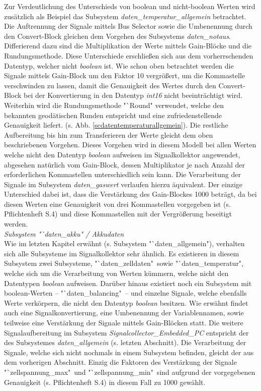 \documentclass[fontsize = 12pt, paper = a4]{scrreprt}
\begin{document}
Zur Verdeutlichung des Unterschieds von boolean und nicht-boolean Werten wird zusätzlich als Beispiel das Subsystem \textit{daten\_temperatur\_allgemein} betrachtet. Die Auftrennung der Signale mittels Bus Selector sowie die Umbenennung durch den Convert-Block gleichen dem Vorgehen des Subsystems \textit{daten\_notaus}. Differierend dazu sind die Multiplikation der Werte mittels Gain-Blöcke und die Rundungsmethode. Diese Unterschiede erschließen sich aus dem vorherrschenden Datentyp, welcher nicht \textit{boolean} ist. Wie schon oben betrachtet werden die Signale mittels Gain-Block um den Faktor 10 vergrößert, um die Kommastelle verschwinden zu lassen, damit die Genauigkeit des Wertes durch den Convert-Block bei der Konvertierung in den Datentyp \textit{int16} nicht beeinträchtigt wird. Weiterhin wird die Rundungsmethode "`Round" verwendet, welche den bekannten geodätischen Runden entspricht und eine zufriedenstellende Genauigkeit liefert. (s. Abb. \ref{scdatentemperaturallgemein}). Die restliche Aufbereitung bis hin zum Transferieren der Werte gleicht dem oben beschriebenen Vorgehen. Dieses Vorgehen wird in diesem Modell bei allen Werten welche nicht den Datentyp \textit{boolean} aufweisen im Signalkollektor angewendet, abgesehen natürlich vom Gain-Block, dessen Multiplikator je nach Anzahl der erforderlichen Kommastellen unterschiedlich sein kann. Die Verarbeitung der Signale im Subsystem \textit{daten\_gaswert} verlaufen hierzu äquivalent. Der einzige Unterschied dabei ist, dass die Verstärkung des Gain-Blockes 1000 beträgt, da bei diesen Werten eine Genauigkeit von drei Kommastellen vorgegeben ist (s. Pflichtenheft S.4) und diese Kommastellen mit der Vergrößerung beseitigt werden. \\



\textit{Subsystem "`daten\_akku" / Akkudaten} \\

Wie im letzten Kapitel erwähnt (s. Subsystem "`daten\_allgemein"), verhalten sich alle Subsysteme im Signalkollektor sehr ähnlich. Es existieren in diesem Subsystem zwei Subsysteme, "`daten\_zelldaten"\ sowie "`daten\_temperatur", welche sich um die Verarbeitung von Werten kümmern, welche nicht den Datentypen \textit{boolean} aufweisen. Darüber hinaus existiert noch ein Subsystem mit boolean-Werten -- "`daten\_balancing"\ -- und einzelne Signale, welche ebenfalls Werte verkörpern, die nicht den Datentyp \textit{boolean} besitzen. Wie erwähnt findet auch eine Signalkonvertierung, eine Umbenennung der Variablennamen, sowie teilweise eine Verstärkung der Signale mittels Gain-Blöcken statt. Die weitere Signalaufbereitung im Subsystem \textit{Signalcollector\_Embedded\_PC} entspricht der des Subsystemes \textit{daten\_allgemein} (s. letzten Abschnitt). Die Verarbeitung der Signale, welche sich nicht nochmals in einem Subsystem befinden, gleicht der aus dem vorherigen Abschnitt. Einzig die Faktoren des Verstärkung der Signale "`zellspannung\_max"\ und "`zellspannung\_min"\ sind aufgrund der vorgegebenen Genauigkeit (s. Pflichtenheft S.4) in diesem Fall zu 1000 gewählt.
\end{document}
